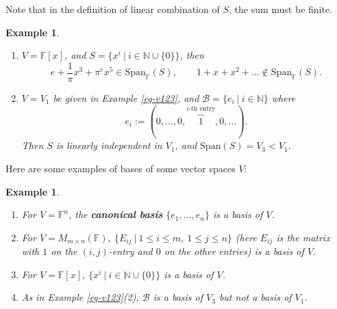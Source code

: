 \documentclass[12pt]{amsbook}
\newtheorem{example}[theorem]{Example}
\begin{document}
Note that in the definition of linear combination of $S$, the sum must be finite. 

\begin{example} \label{eg-finitesum}
\begin{enumerate}
    \item $V = \mathbb{F}[x]$, and $S = \{x^i \ |\ i \in \mathbb{N} \cup \{0\}\}$, then
$$e+ \frac{1}{\pi} x^3 + \pi^{e}x^5 \in \mathrm{Span}_{\mathbb{F}}(S), \quad \quad 1+x+x^2+ \dots \notin \mathrm{Span}_{\mathbb{F}}(S).$$
    \item $V = V_1$ be given in Example \ref{eg-v123}, and $\mathcal{B} = \{e_i\ |\ i \in \mathbb{N}\}$ where 
    $$e_i := (0,\dots,0,\overbrace{1}^{i\text{-th entry}},0,\dots).$$ 
    Then $S$ is linearly independent in $V_1$, and $\mathrm{Span}(S) = V_3 < V_1$.
\end{enumerate}    
\end{example}

Here are some examples of bases of some vector spaces $V$:
\begin{example}\
    \begin{enumerate}
        \item For $V = \mathbb{F}^n$, the {\bf canonical basis} $\{e_1, \dots, e_n\}$ is a basis of $V$.
        \item For $V = M_{m\times n}(\mathbb{F})$, $\{E_{ij}\ |\ 1 \leq i \leq m,\ 1 \leq j \leq n\}$ (here $E_{ij}$ is the matrix with $1$ on the $(i,j)$-entry and $0$ on the other entries) is a basis of $V$.
        \item For $V = \mathbb{F}[x]$, $\{x^i \ |\ i \in \mathbb{N} \cup \{0\}\}$ is a basis of $V$.
        \item As in Example \ref{eg-v123}(2), $\mathcal{B}$ is a basis of $V_3$ but not a basis of $V_1$.
    \end{enumerate}
\end{example}
\end{document}
